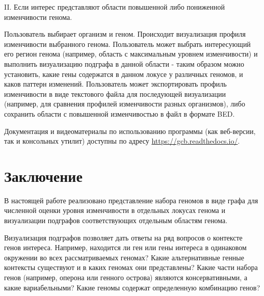 II. Если интерес представляют области повышенной либо пониженной изменчивости генома.

Пользователь выбирает организм и геном. Происходит визуализация профиля изменчивости выбранного генома. Пользователь может выбрать интересующий его регион генома (например, область с максимальным уровнем изменчивости) и выполнить визуализацию подграфа в данной области - таким образом можно установить, какие гены содержатся в данном локусе у различных геномов, и каков паттерн изменений. Пользователь может экспортировать профиль изменчивости в виде текстового файла для последующей визуализации (например, для сравнения профилей изменчивости разных организмов), либо сохранить области с повышенной изменчивостью в файл в формате BED. 

Документация и видеоматериалы по использованию программы (как веб-версии, так и консольных утилит) доступны по адресу \url{https://gcb.readthedocs.io/}. 


\FloatBarrier
{}                                  %
\section*{Заключение}

В настоящей работе реализовано представление набора геномов в виде графа для численной оценки уровня изменчивости в отдельных локусах генома и визуализации подграфов соответствующих отдельным областям генома. 

Визуализация подграфов позволяет дать ответы на ряд вопросов о контексте генов интереса. Например, находится ли ген или гены интереса в одинаковом окружении во всех рассматриваемых геномах? Какие альтернативные генные контексты существуют и в каких геномах они представлены? Какие части набора генов (например, оперона или генного острова) являются консервативными, а какие вариабельными? Какие геномы содержат определенную комбинацию генов? 

